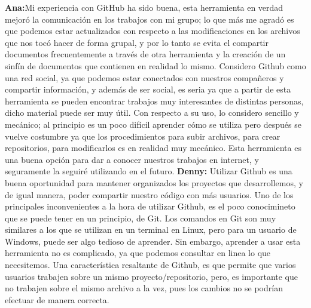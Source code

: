 \documentclass[12pt]{report}
\begin{document}
	\endgroup
	\textbf{Ana:\newline\newline}Mi experiencia con GitHub ha sido buena, esta herramienta en verdad mejoró la comunicación en los trabajos con mi grupo; lo que más me agradó es que podemos estar actualizados con respecto a las modificaciones en los archivos que nos tocó hacer de forma grupal, y por lo tanto se evita el compartir documentos frecuentemente a través de otra herramienta y la creación de un sinfín de documentos que contienen en realidad lo mismo.
\newline
\newline	
Considero Github como una red social, ya que podemos estar conectados con nuestros compañeros y compartir información, y además de ser social, es seria ya que a partir de esta herramienta se pueden encontrar trabajos muy interesantes de distintas personas, dicho material puede ser muy útil.
\newline
\newline	
Con respecto a su uso, lo considero sencillo y mecánico; al principio es un poco difícil aprender cómo se utiliza pero después se vuelve costumbre ya que los procedimientos para subir archivos, para crear repositorios, para modificarlos es en realidad muy mecánico.
\newline
Esta herramienta es una buena opción para dar a conocer nuestros trabajos en internet, y seguramente la seguiré utilizando en el futuro.
\newline
\newline
\textbf{Denny:\newline\newline} Utilizar Github es una buena oportunidad para mantener organizados los proyectos que desarrollemos, y de igual manera, poder compartir nuestro código con más usuarios. 
\newline
\newline
Uno de los principales inconvenientes a la hora de utilizar Github, es el poco conocimineto que se puede tener en un principio, de Git. Los comandos en Git son muy similares a los que se utilizan en un terminal en Linux, pero para un usuario de Windows, puede ser algo tedioso de aprender. Sin embargo, aprender a usar esta herramienta no es complicado, ya que podemos consultar en linea lo que necesitemos.
\newline
\newline
Una característica resaltante de Github, es que permite que varios usuarios trabajen sobre un mismo proyecto/repositorio, pero, es importante que no trabajen sobre el mismo archivo a la vez, pues los cambios no se podrían efectuar de manera correcta.
\end{document}
